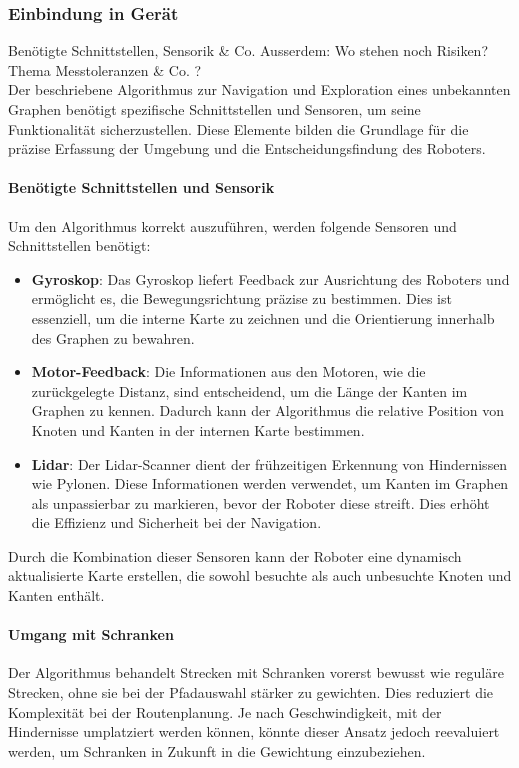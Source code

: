 \documentclass[main.tex]{subfiles} %
\begin{document}
\subsubsection{Einbindung in Gerät}
Benötigte Schnittstellen, Sensorik \& Co. Ausserdem: Wo stehen noch Risiken?
Thema Messtoleranzen \& Co. ?\\

Der beschriebene Algorithmus zur Navigation und Exploration eines unbekannten Graphen benötigt spezifische Schnittstellen und Sensoren, um seine Funktionalität sicherzustellen. Diese Elemente bilden die Grundlage für die präzise Erfassung der Umgebung und die Entscheidungsfindung des Roboters.

\paragraph{Benötigte Schnittstellen und Sensorik}
Um den Algorithmus korrekt auszuführen, werden folgende Sensoren und Schnittstellen benötigt:

\begin{itemize}
    \item \textbf{Gyroskop}:  
    Das Gyroskop liefert Feedback zur Ausrichtung des Roboters und ermöglicht es, die Bewegungsrichtung präzise zu bestimmen. Dies ist essenziell, um die interne Karte zu zeichnen und die Orientierung innerhalb des Graphen zu bewahren.

    \item \textbf{Motor-Feedback}:  
    Die Informationen aus den Motoren, wie die zurückgelegte Distanz, sind entscheidend, um die Länge der Kanten im Graphen zu kennen. Dadurch kann der Algorithmus die relative Position von Knoten und Kanten in der internen Karte bestimmen.

    \item \textbf{Lidar}:  
    Der Lidar-Scanner dient der frühzeitigen Erkennung von Hindernissen wie Pylonen. Diese Informationen werden verwendet, um Kanten im Graphen als unpassierbar zu markieren, bevor der Roboter diese streift. Dies erhöht die Effizienz und Sicherheit bei der Navigation.

\end{itemize}

Durch die Kombination dieser Sensoren kann der Roboter eine dynamisch aktualisierte Karte erstellen, die sowohl besuchte als auch unbesuchte Knoten und Kanten enthält.

\paragraph{Umgang mit Schranken}  
Der Algorithmus behandelt Strecken mit Schranken vorerst bewusst wie reguläre Strecken, ohne sie bei der Pfadauswahl stärker zu gewichten. Dies reduziert die Komplexität bei der Routenplanung. Je nach Geschwindigkeit, mit der Hindernisse umplatziert werden können, könnte dieser Ansatz jedoch reevaluiert werden, um Schranken in Zukunft in die Gewichtung einzubeziehen.
\end{document}

